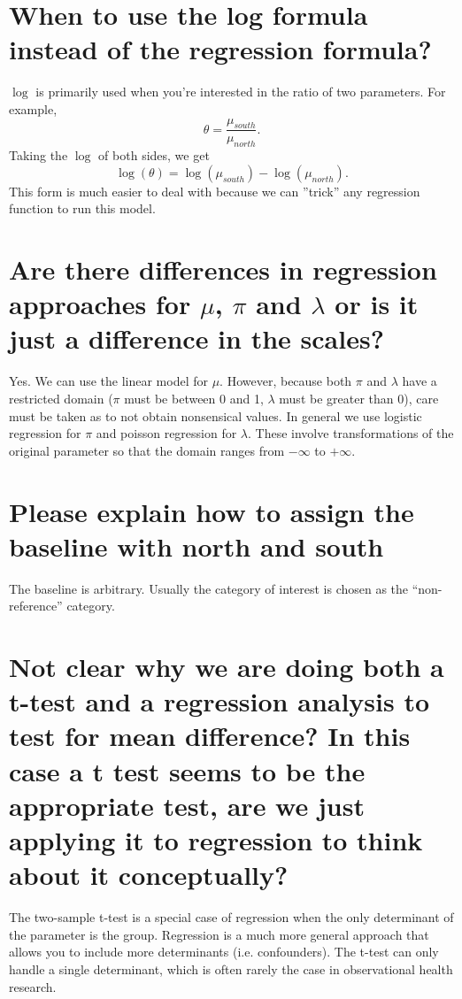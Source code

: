 \documentclass[landscape,twocolumn,letterpaper,9pt,reqno]{article}
\begin{document}
\section{When to use the log formula instead of the regression formula?}

$\log$ is primarily used when you're interested in the ratio of two parameters. For example, $$\theta = \frac{\mu_{south}}{\mu_{north}}.$$ Taking the $\log$ of both sides, we get $$\log(\theta) = \log(\mu_{south}) - \log(\mu_{north}).$$ This form is much easier to deal with because we can ''trick'' any regression function to run this model. 

\section{Are there differences in regression approaches for $\mu$, $\pi$ and $\lambda$ or is it just a difference in the scales?}

Yes. We can use the linear model for $\mu$. However, because both $\pi$ and $\lambda$ have a restricted domain ($\pi$ must be between 0 and 1, $\lambda$ must be greater than 0), care must be taken as to not obtain nonsensical values. In general we use logistic regression for $\pi$ and poisson regression for $\lambda$. These involve transformations of the original parameter so that the domain ranges from $-\infty$ to $+\infty$. 
	
\section{Please explain how to assign the baseline with north and south}	

The baseline is arbitrary. Usually the category of interest is chosen as the ``non-reference'' category. 

\section{Not clear why we are doing both a t-test and a regression analysis to test for mean difference? In this case a t test seems to be the appropriate test, are we just applying it to regression to think about it conceptually?}

The two-sample t-test is a special case of regression when the only determinant of the parameter is the group. Regression is a much more general approach that allows you to include more determinants (i.e. confounders). The t-test can only handle a single determinant, which is often rarely the case in observational health research. 
\end{document}
